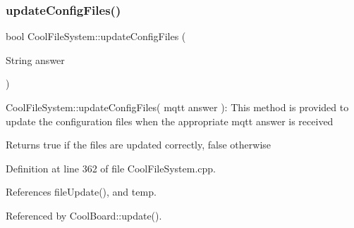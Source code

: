 \subsubsection{\texorpdfstring{update\+Config\+Files()}{updateConfigFiles()}}
{\footnotesize\ttfamily bool Cool\+File\+System\+::update\+Config\+Files (\begin{DoxyParamCaption}\item[{String}]{answer }\end{DoxyParamCaption})}

Cool\+File\+System\+::update\+Config\+Files( mqtt answer )\+: This method is provided to update the configuration files when the appropriate mqtt answer is received

\begin{DoxyReturn}{Returns}
true if the files are updated correctly, false otherwise 
\end{DoxyReturn}


Definition at line 362 of file Cool\+File\+System.\+cpp.



References file\+Update(), and temp.



Referenced by Cool\+Board\+::update().


